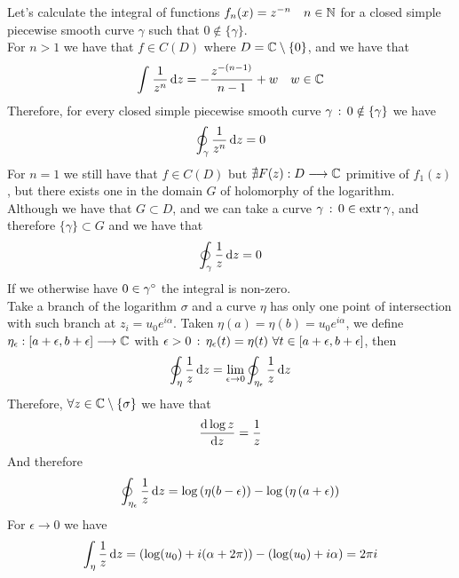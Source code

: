 \documentclass[../complete.tex]{subfiles}
\begin{document}
\begin{eg}
	Let's calculate the integral of functions $f_n(x)=z^{-n}\quad n\in\mathbb{N}$ for a closed simple piecewise smooth curve $\gamma$ such that $0\notin\{\gamma\}$.\\
	For $n>1$ we have that $f\in C(D)$ where $D=\mathbb{C}\setminus\{0\}$, and we have that
	\begin{equation*}
		\int_{}^{}\frac{1}{z^n}\operatorname{d\!} z=-\frac{z^{-(n-1)}}{n-1}+w\quad w\in\mathbb{C}
	\end{equation*}
	Therefore, for every closed simple piecewise smooth curve $\gamma\, :\, 0\notin\{\gamma\}$ we have
	\begin{equation*}
		\oint_\gamma\frac{1}{z^n}\operatorname{d\!} z=0
	\end{equation*}
	For $n=1$ we still have that $f\in C(D)$ but $\nexists F(z):D\overset{}{\longrightarrow}\mathbb{C}$ primitive of $f_1(z)$, but there exists one in the domain $G$ of holomorphy of the logarithm.\\
	Although we have that $G\subset D$, and we can take a curve $\gamma\, :\, 0\in\operatorname{extr}{\gamma}$, and therefore $\{\gamma\}\subset G$ and we have that
	\begin{equation*}
		\oint_{\gamma}\frac{1}{z}\operatorname{d\!} z=0
	\end{equation*}
	If we otherwise have $0\in\gamma^{\circ}$ the integral is non-zero.\\
	Take a branch of the logarithm $\sigma$ and a curve $\eta$ has only one point of intersection with such branch at $z_i=u_0e^{i\alpha}$. Taken $\eta(a)=\eta(b)=u_0e^{i\alpha}$, we define
	$\eta_\epsilon:[a+\epsilon,b+\epsilon]\overset{}{\longrightarrow}\mathbb{C}$ with $\epsilon>0\, :\, \eta_\epsilon(t)=\eta(t)\ \forall t\in[a+\epsilon,b+\epsilon]$, then
	\begin{equation*}
		\oint_\eta\frac{1}{z}\operatorname{d\!} z=\lim_{\epsilon\to0}\oint_{\eta_\epsilon}\frac{1}{z}\operatorname{d\!} z
	\end{equation*}
	Therefore, $\forall z\in\mathbb{C}\setminus\{\sigma\}$ we have that
	\begin{equation*}
		\derivative{\log{z}}{z}=\frac{1}{z}
	\end{equation*}
	And therefore
	\begin{equation*}
		\oint_{\eta_\epsilon}\frac{1}{z}\operatorname{d\!} z=\log\left( \eta(b-\epsilon) \right)-\log\left( \eta\left( a+\epsilon \right) \right)
	\end{equation*}
	For $\epsilon\to0$ we have
	\begin{equation*}
		\int_{\eta}^{}\frac{1}{z}\operatorname{d\!} z=\left( \log(u_0)+i(\alpha+2\pi) \right)-\left( \log(u_0)+i\alpha \right)=2\pi i
	\end{equation*}
\end{eg}
\end{document}

